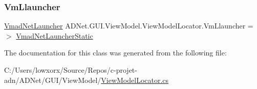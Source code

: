 \subsubsection{\texorpdfstring{Vm\+Llauncher}{VmLlauncher}}
{\footnotesize\ttfamily \hyperlink{class_a_d_net_1_1_g_u_i_1_1_view_model_1_1_vmad_net_launcher}{Vmad\+Net\+Launcher} A\+D\+Net.\+G\+U\+I.\+View\+Model.\+View\+Model\+Locator.\+Vm\+Llauncher =$>$ \hyperlink{class_a_d_net_1_1_g_u_i_1_1_view_model_1_1_view_model_locator_a04e0f62e6c93901369e1f394255f9dd4}{Vmad\+Net\+Launcher\+Static}}



The documentation for this class was generated from the following file\+:\begin{DoxyCompactItemize}
\item 
C\+:/\+Users/lowxorx/\+Source/\+Repos/c-\/projet-\/adn/\+A\+D\+Net/\+G\+U\+I/\+View\+Model/\hyperlink{_a_d_net_2_g_u_i_2_view_model_2_view_model_locator_8cs}{View\+Model\+Locator.\+cs}\end{DoxyCompactItemize}

